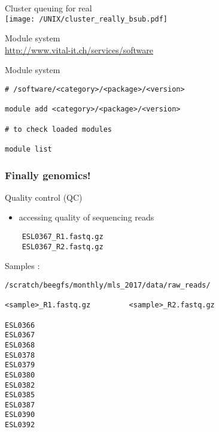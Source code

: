 \documentclass[xcolor=dvipsnames]{beamer}
\begin{document}
\begin{frame}
	\begin{center}
		\Huge
		Cluster queuing for real\\
		\vspace{1cm}
		\texttt{[image: /UNIX/cluster\_really\_bsub.pdf]}
	\end{center}
\end{frame}

\begin{frame}
	\begin{center}
		\Huge
		Module system\\
		\vspace{1cm}
		\Large
		\url{http://www.vital-it.ch/services/software}
	\end{center}
\end{frame}

\begin{frame}[fragile]
\begin{center}
\Huge
Module system\\
\vspace{1cm}
\large
\begin{verbatim}
# /software/<category>/<package>/<version>

module add <category>/<package>/<version>

# to check loaded modules

module list
\end{verbatim}
\end{center}
\end{frame}

\begin{frame}
	\frametitle{Finally genomics!}
	Quality control (QC)
	\large
	\begin{itemize}
		\item accessing quality of sequencing reads
	\end{itemize}
\end{frame}

\begin{frame}[fragile]
\begin{verbatim}
	ESL0367_R1.fastq.gz
	ESL0367_R2.fastq.gz
\end{verbatim}
\end{frame}

\begin{frame}[fragile]
\large
Samples :
\begin{verbatim}
/scratch/beegfs/monthly/mls_2017/data/raw_reads/

<sample>_R1.fastq.gz         <sample>_R2.fastq.gz

ESL0366
ESL0367
ESL0368
ESL0378
ESL0379
ESL0380
ESL0382
ESL0385
ESL0387
ESL0390
ESL0392
\end{verbatim}
\end{frame}
\end{document}
